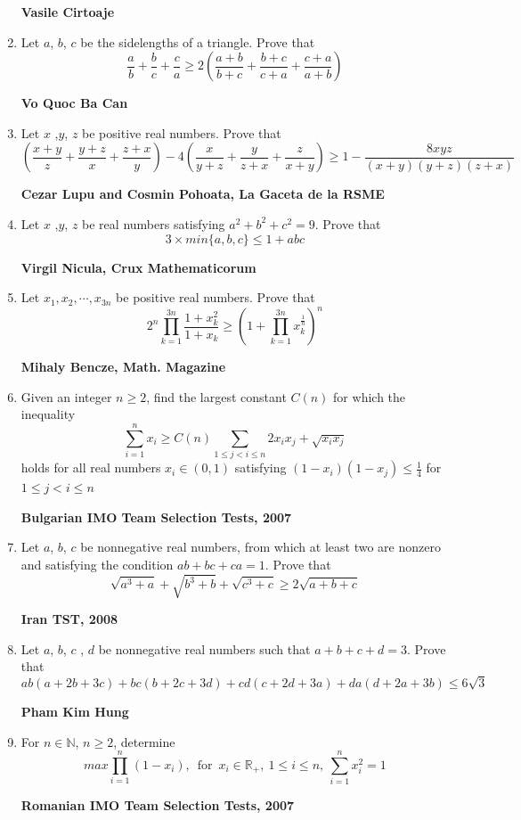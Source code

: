 \documentclass{article}
\begin{document}
\begin{enumerate}
\begin{flushright}
	\textbf{Vasile Cirtoaje}
\end{flushright}
\item Let $a$, $b$, $c$ be the sidelengths of a triangle. Prove that$$\frac{a}{b}+\frac{b}{c}+\frac{c}{a}\geq 2\left(\frac{a+b}{b+c}+\frac{b+c}{c+a}+\frac{c+a}{a+b}\right)$$
\begin{flushright}
	\textbf{Vo Quoc Ba Can}
\end{flushright}
\item Let $x$ ,$y$, $z$ be positive real numbers. Prove that $$\left(\frac{x+y}{z}+\frac{y+z}{x}+\frac{z+x}{y}\right)-4\left(\frac{x}{y+z}+\frac{y}{z+x}+\frac{z}{x+y}\right)\geq 1-\frac{8xyz}{(x+y)(y+z)(z+x)}$$
\begin{flushright}
	\textbf{Cezar Lupu and Cosmin Pohoata, La Gaceta de la RSME}
\end{flushright}
\item Let $x$ ,$y$, $z$ be real numbers satisfying $a^2+b^2+c^2=9$. Prove that $$3\times min\{a,b,c\}\leq 1+abc$$
\begin{flushright}
	\textbf{Virgil Nicula, Crux Mathematicorum}
\end{flushright}
\item Let $x_1, x_2,\cdots , x_{3n}$ be positive real numbers. Prove that$$2^n\prod \limits_{k=1}^{3n}\frac{1+x_k^2}{1+x_k}\geq \left(1+\prod \limits_{k=1}^{3n} x_k^{\frac{1}{n}}\right)^n$$
\begin{flushright}
	\textbf{Mihaly Bencze, Math. Magazine}
\end{flushright}
\item Given an integer $n \geq 2$, find the largest constant $C(n)$ for which the inequality$$\sum \limits_{i=1}^nx_i\geq C(n)\sum \limits_{1\leq j< i\leq n}2x_ix_j+\sqrt{x_ix_j}$$holds for all real numbers $x_i \in(0, 1)$ satisfying $(1 - x_i)(1 - x_j) \leq \frac{1}{4}$ for $1 \leq j < i \leq n$
\begin{flushright}
	\textbf{Bulgarian IMO Team Selection Tests, 2007}
\end{flushright}
\item Let $a$, $b$, $c$ be nonnegative real numbers, from which at least two are nonzero and satisfying the condition $ab + bc + ca = 1$. Prove that $$\sqrt{a^3 + a} + \sqrt{b^3 + b} + \sqrt{c^3 + c} \geq 2\sqrt{a + b + c}$$
\begin{flushright}
	\textbf{Iran TST, 2008}
\end{flushright}
\item Let $a$, $b$, $c$ , $d$ be nonnegative real numbers such that $a + b + c + d = 3$. Prove that $$ab(a + 2b + 3c) + bc(b + 2c + 3d) + cd(c + 2d + 3a) + da(d + 2a + 3b) \leq 6\sqrt{3}$$
\begin{flushright}
	\textbf{Pham Kim Hung}
\end{flushright}
\item For $n \in \mathbb{N}$, $n \geq 2$, determine $$max\prod \limits_{i=1}^n\left(1-x_i\right),\ \operatorname{for}\ x_i \in \mathbb{R}_+,\ 1\leq i\leq n,\ \sum \limits_{i=1}^nx_i^2=1$$
\begin{flushright}
	\textbf{Romanian IMO Team Selection Tests, 2007}
\end{flushright}


\end{enumerate}
\end{document}
